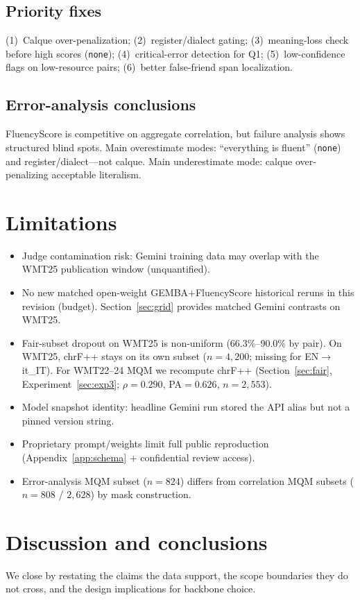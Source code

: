 \documentclass[11pt]{article}
\newcommand{\FS}{FluencyScore}
\begin{document}
\subsection{Priority fixes}
\label{sec:fixes}
(1)~Calque over-penalization;
(2)~register/dialect gating;
(3)~meaning-loss check before high scores (\texttt{none});
(4)~critical-error detection for Q1;
(5)~low-confidence flags on low-resource pairs;
(6)~better false-friend span localization.

\subsection{Error-analysis conclusions}
\FS{} is competitive on aggregate correlation, but failure analysis shows
structured blind spots.
Main overestimate modes: ``everything is fluent'' (\texttt{none}) and
register/dialect---not calque.
Main underestimate mode: calque over-penalizing acceptable literalism.

\section{Limitations}
\label{sec:limits}
\begin{itemize}
\item Judge contamination risk: Gemini training data may overlap with the WMT25
  publication window (unquantified).
\item No new matched open-weight GEMBA+\FS{} historical reruns in this revision
  (budget). Section~\ref{sec:grid} provides matched Gemini contrasts on WMT25.
\item Fair-subset dropout on WMT25 is non-uniform (66.3\%--90.0\% by pair).
  On WMT25, chrF++ stays on its own subset ($n{=}4{,}200$; missing for EN$\to$it\_IT).
  For WMT22--24 MQM we recompute chrF++ (Section~\ref{sec:fair}, Experiment~\ref{sec:exp3}; $\rho{=}0.290$, PA${=}0.626$, $n{=}2{,}553$).
\item Model snapshot identity: headline Gemini run stored the API alias but not
  a pinned version string.
\item Proprietary prompt/weights limit full public reproduction
  (Appendix~\ref{app:schema} + confidential review access).
\item Error-analysis MQM subset ($n{=}824$) differs from correlation MQM subsets
  ($n{=}808$ / $2{,}628$) by mask construction.
\end{itemize}

\section{Discussion and conclusions}
We close by restating the claims the data support, the scope boundaries they do not cross, and the design implications for backbone choice.
\end{document}
